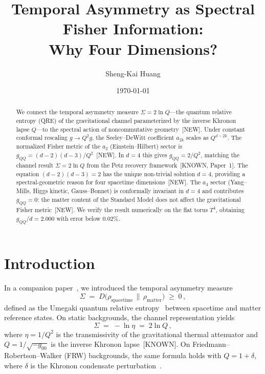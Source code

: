 \documentclass[prl,twocolumn,superscriptaddress,longbibliography]{revtex4-2}
\begin{document}
\title{Temporal Asymmetry as Spectral Fisher Information:\\
Why Four Dimensions?}

\author{Sheng-Kai Huang}

\date{\today}

\begin{abstract}
We connect the temporal asymmetry measure
$\Sigma = 2\ln Q$---the quantum relative entropy (QRE)
of the gravitational channel parameterized by the inverse
Khronon lapse $Q$---to the spectral action of
noncommutative geometry~[NEW].
Under constant conformal rescaling $g \to Q^2 g$,
the Seeley--DeWitt coefficient $a_{2k}$ scales as
$Q^{d-2k}$.
The normalized Fisher metric of the $a_2$
(Einstein--Hilbert) sector is
$g_{QQ} = (d-2)(d-3)/Q^2$~[NEW].
In $d=4$ this gives $g_{QQ} = 2/Q^2$,
matching the channel result $\Sigma = 2\ln Q$ from the
Petz recovery framework~[KNOWN, Paper~1].
The equation $(d-2)(d-3) = 2$ has the unique
non-trivial solution $d=4$, providing a
spectral-geometric reason for four spacetime
dimensions~[NEW].
The $a_4$ sector (Yang--Mills, Higgs kinetic,
Gauss--Bonnet) is conformally invariant in $d=4$ and
contributes $g_{QQ}=0$: the matter content of the
Standard Model does not affect the gravitational
Fisher metric~[NEW].
We verify the result numerically on the flat torus $T^4$,
obtaining $g_{QQ}/d = 2.000$ with error below $0.02\%$.
\end{abstract}

\maketitle


\section{Introduction}
\label{sec:intro}

In a companion paper~\cite{PaperI}, we introduced the
temporal asymmetry measure
\begin{equation}\label{eq:Sigma}
  \Sigma \;=\; D\bigl(\rho_{\mathrm{spacetime}}
  \,\big\|\, \rho_{\mathrm{matter}}\bigr)
  \;\geq\; 0\,,
\end{equation}
defined as the Umegaki quantum relative
entropy~\cite{Umegaki1962} between spacetime and
matter reference states.
On static backgrounds, the channel representation
yields~\cite{PaperII}
\begin{equation}\label{eq:2lnQ}
  \Sigma \;=\; -\ln\eta \;=\; 2\ln Q\,,
\end{equation}
where $\eta = 1/Q^2$ is the transmissivity of the
gravitational thermal attenuator and
$Q = 1/\sqrt{-g_{00}}$ is the inverse Khronon
lapse~[KNOWN].
On Friedmann--Robertson--Walker (FRW)
backgrounds, the same formula holds with
$Q = 1 + \delta$, where $\delta$ is the Khronon
condensate perturbation~\cite{PaperIII}.
\end{document}
